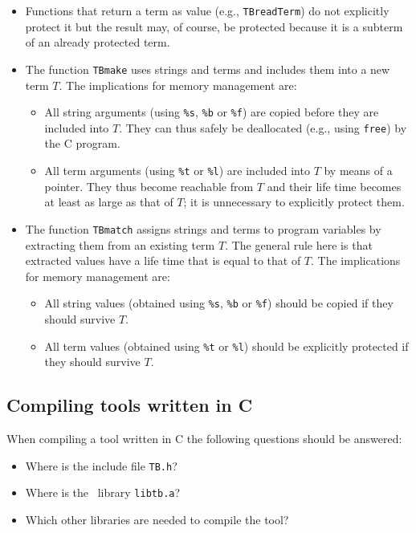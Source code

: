 \documentclass[a4,twoside,noweb]{article} %
\begin{document}
\begin{itemize}

\item Functions that return a term as value (e.g., {\tt TBreadTerm}) 
do not explicitly protect it but the result may, of course, be
protected because it is a subterm of an already protected term.

\item The function {\tt TBmake} uses strings and terms and includes
them into a new term $T$. The implications for memory management are:
\begin{itemize}
\item All string arguments (using {\tt \%s}, {\tt \%b} or {\tt \%f})
are copied before they are included into $T$.
They can thus safely be deallocated (e.g., using {\tt free}) by the C program.

\item All term arguments (using {\tt \%t} or {\tt \%l}) are included
into $T$ by means of a pointer.
They thus become reachable from $T$ and
their life time becomes at least as large as that of $T$;
it is unnecessary to explicitly protect them.
\end{itemize}

\item The function {\tt TBmatch} assigns strings and terms to program variables
by extracting them from an existing term $T$. The general rule here is that
extracted values have a life time that is equal to that of $T$.
The implications for memory management are:
\begin{itemize}
\item All string values (obtained using {\tt \%s}, {\tt \%b} or {\tt \%f})
should be copied if they should survive $T$.
\item All term values (obtained using {\tt \%t} or {\tt \%l}) should
be explicitly protected if they should survive $T$.
\end{itemize}

\end{itemize}

\subsection{Compiling tools written in C}
When compiling a tool written in C the following questions
should be answered:
\begin{itemize}
\item Where is the include file {\tt TB.h}?
\item Where is the \TB\ library {\tt libtb.a}?
\item Which other libraries are needed to compile the tool?
\end{itemize}
\end{document}
